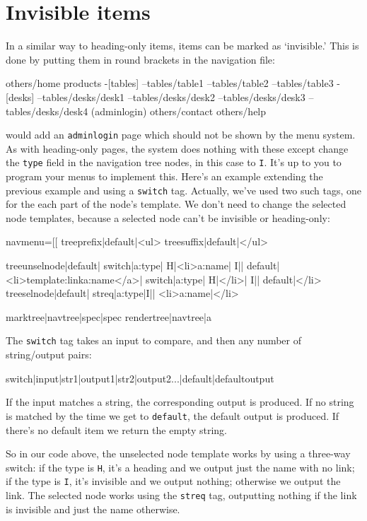 \clearpage
\section{Invisible items}
\label{invisitems}
In a similar way to heading-only items, items can be marked as `invisible.'
This is done by putting them in round brackets in the navigation file:
\begin{MyVerbatim}
others/home
products
-[tables]
--tables/table1
--tables/table2
--tables/table3
-[desks]
--tables/desks/desk1
--tables/desks/desk2
--tables/desks/desk3
--tables/desks/desk4
(adminlogin)
others/contact
others/help
\end{MyVerbatim}
would add an \texttt{adminlogin} page which should not be shown by the menu
system. As with heading-only pages, the system does nothing with these except
change the \texttt{type} field in the navigation tree nodes, in this case to
\texttt{I}. It's up to you to program your menus to implement this. Here's
an example extending the previous example and using a \texttt{switch} tag. Actually,
we've used two such tags, one for the each part of the node's template. We don't
need to change the selected node templates, because a selected node can't be invisible
or heading-only:

\begin{MyVerbatim}
navmenu=[[
    {{treeprefix|default|<ul>}}
    {{treesuffix|default|</ul>}}
    
    {{treeunselnode|default|
        {{switch|{{a:type}}|
            H|<li>{{a:name}}|
            I||
            default|<li>{{template:link}}{{a:name}}</a>}}|
        {{switch|{{a:type}}|
            H|</li>|
            I||
            default|</li>}}
    }}        
    {{treeselnode|default|
            {{streq|{{a:type}}|I||
                <li>{{a:name}}|</li>}}}}

    {{marktree|{{navtree}}|spec|{{spec}}}}
    {{rendertree|{{navtree}}|a}}
\end{MyVerbatim}
The \texttt{switch} tag takes an input to compare, and then any number of string/output pairs:
\begin{MyVerbatim}
{{switch|input|str1|output1|str2|output2...|default|defaultoutput}}
\end{MyVerbatim}
If the input matches a string, the corresponding output is produced. If no string is matched by
the time we get to \texttt{default}, the default output is produced. If there's no default item
we return the empty string.

So in our code above, the unselected node template works by using a three-way switch:
if the type is \texttt{H}, it's a heading and we output just the name with no link; if the type
is \texttt{I}, it's invisible and we output nothing; otherwise we output the link.
The selected node works using the \texttt{streq} tag, outputting nothing if the link is invisible
and just the name otherwise.
\clearpage
